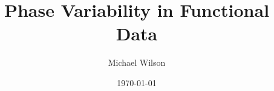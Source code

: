 \documentclass{beamer}
\title[Phase Variability]{Phase Variability in Functional Data} %
\author{Michael Wilson} %
\institute[Florida State University] %
{
Florida State University \\ %
\medskip
\textit{mkw19c@my.fsu.edu} %
}
\date{\today} %
\begin{document}
\begin{frame}
\titlepage %
\end{frame}





\end{document}

